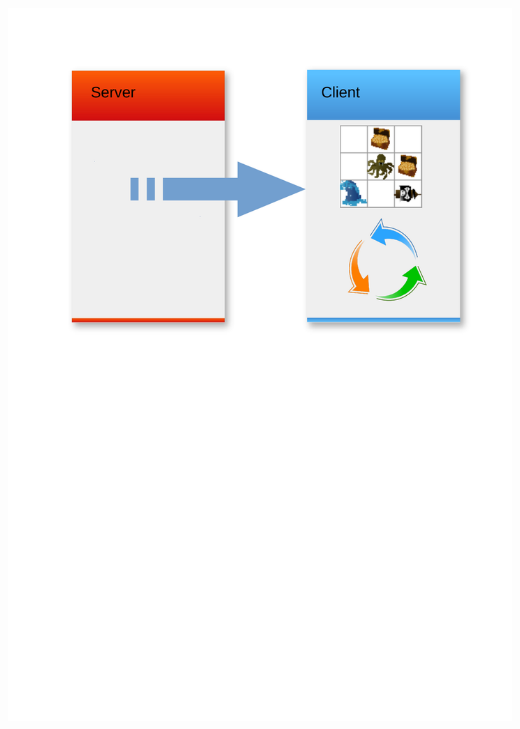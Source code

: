 \begin{frame}
	\begin{center}
		\includegraphics[scale=0.5]{simulation/Simulation1.pdf}
	\end{center}
	
\end{frame}

